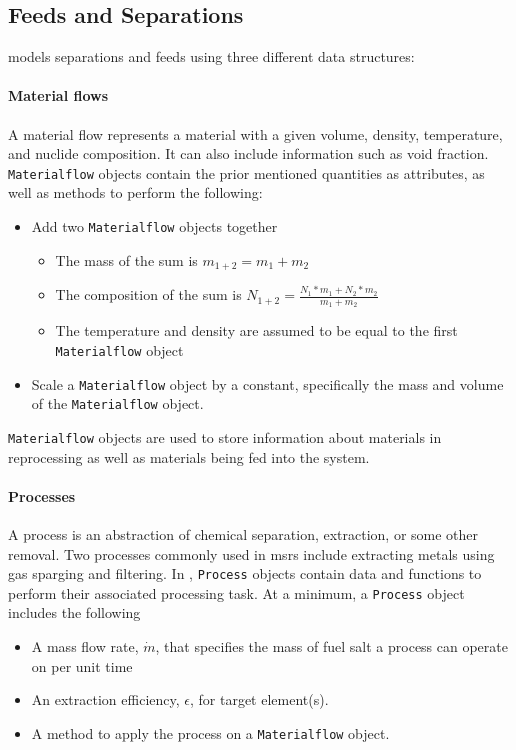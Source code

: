 \subsection{Feeds and Separations}
\label{sub:feeds-separations}
\SaltProc models separations and feeds using three different data structures:

\paragraph{Material flows}
    A material flow represents a material with a given
    volume, density, temperature, and nuclide composition.
    It can also include information such as void fraction. \verb.Materialflow.
    objects contain the prior mentioned quantities as attributes, as well as
    methods to perform the following:
    \begin{itemize}
        \item Add two \verb.Materialflow. objects together
            \begin{itemize}
                \item The mass of the sum is $m_{1+2} = m_{1} + m_{2}$
                \item The composition of the sum is $N_{1+2} = \frac{N_{1} * m_{1} + N_{2} * m_{2}}{m_{1} + m_{2}}$
                \item The temperature and density are assumed to be equal to the
                    first \verb.Materialflow. object
            \end{itemize}
        \item Scale a \verb.Materialflow. object by a constant, specifically
            the mass and volume of the \verb.Materialflow. object.
    \end{itemize}
    \verb.Materialflow. objects are used to store information about materials
    in reprocessing as well as materials being fed into the system.

\paragraph{Processes}
    A process is an abstraction of chemical separation, extraction, or some
    other removal. Two processes commonly used in \Gls{msr}s include
    extracting metals using gas sparging and filtering. In \SaltProc,
    \verb.Process. objects contain data and functions to perform their
    associated processing task. At a minimum, a \verb.Process. object includes
    the following
    \begin{itemize}
        \item A mass flow rate, $\dot{m}$, that specifies the mass of fuel salt a process can operate on per unit time
        \item An extraction efficiency, $\epsilon$, for target element(s).
        \item A method to apply the process on a \verb.Materialflow. object. 
    \end{itemize}

